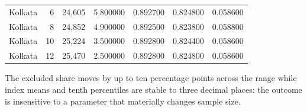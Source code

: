 \begin{table}[htbp]
\begin{tabular}{lrlrrrr}
Kolkata & 6 & 24,605 & 5.800000 & 0.892700 & 0.824800 & 0.058600 \\
Kolkata & 8 & 24,852 & 4.900000 & 0.892500 & 0.823800 & 0.058800 \\
Kolkata & 10 & 25,224 & 3.500000 & 0.892800 & 0.824400 & 0.058600 \\
Kolkata & 12 & 25,470 & 2.500000 & 0.892800 & 0.824800 & 0.058600 \\
\bottomrule
\end{tabular}
\begin{tablenotes}\footnotesize
\item The excluded share moves by up to ten percentage points across the range while index means and tenth percentiles are stable to three decimal places: the outcome is insensitive to a parameter that materially changes sample size.
\end{tablenotes}
\end{table}
